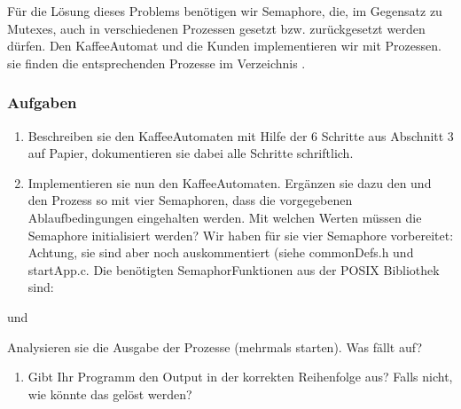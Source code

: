 \documentclass[a4paper,10pt,english]{report}
\begin{document}
\sphinxAtStartPar
Für die Lösung dieses Problems benötigen wir Semaphore, die, im Gegensatz zu Mutexes, auch in verschiedenen Prozessen gesetzt bzw. zurückgesetzt werden dürfen. Den Kaffee\sphinxhyphen{}Automat und die Kunden implementieren wir mit Prozessen. sie finden die entsprechenden Prozesse im Verzeichnis .


\subsubsection{Aufgaben}
\label{\detokenize{P08_Sync/README:id1}}\begin{enumerate}
%
\item {} 
\sphinxAtStartPar
Beschreiben sie den Kaffee\sphinxhyphen{}Automaten mit Hilfe der 6 Schritte aus Abschnitt 3 auf Papier, dokumentieren sie dabei alle Schritte schriftlich.

\item {} 
\sphinxAtStartPar
Implementieren sie nun den Kaffee\sphinxhyphen{}Automaten. Ergänzen sie dazu den  und den  Prozess so mit vier Semaphoren, dass die vorgegebenen Ablaufbedingungen eingehalten werden. Mit welchen Werten müssen die Semaphore initialisiert werden?
Wir haben für sie vier Semaphore vorbereitet: Achtung, sie sind aber noch auskommentiert (siehe commonDefs.h und startApp.c. Die benötigten Semaphor\sphinxhyphen{}Funktionen aus der POSIX Bibliothek sind:

\end{enumerate}

\begin{sphinxVerbatim}[commandchars=\\\{\}]
\end{sphinxVerbatim}

\sphinxAtStartPar
und

\begin{sphinxVerbatim}[commandchars=\\\{\}]
\end{sphinxVerbatim}

\sphinxAtStartPar
Analysieren sie die Ausgabe der Prozesse (mehrmals starten). Was fällt auf?
\begin{enumerate}
%
\item {} 
\sphinxAtStartPar
Gibt Ihr Programm den Output in der korrekten Reihenfolge aus? Falls nicht, wie könnte das gelöst werden?

\end{enumerate}
\end{document}
